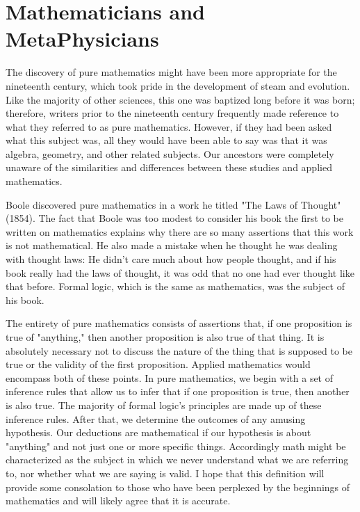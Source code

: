 \documentclass[a4paper,12pt]{book}[2004/02/16]
\theoremstyle{ilemma}
\theoremstyle{itheorem}
\theoremstyle{iother}
\theoremstyle{icorollary}
\theoremstyle{numcorollary}
\theoremstyle{idefinition}
\begin{document}
\chapter{Mathematicians and MetaPhysicians}
The discovery of pure mathematics might have been more appropriate for the nineteenth century, which took pride in the development of steam and evolution. Like the majority of other sciences, this one was baptized long before it was born; therefore, writers prior to the nineteenth century frequently made reference to what they referred to as pure mathematics. However, if they had been asked what this subject was, all they would have been able to say was that it was algebra, geometry, and other related subjects. Our ancestors were completely unaware of the similarities and differences between these studies and applied mathematics.

Boole discovered pure mathematics in a work he titled "The Laws of Thought" (1854). The fact that Boole was too modest to consider his book the first to be written on mathematics explains why there are so many assertions that this work is not mathematical. He also made a mistake when he thought he was dealing with thought laws:
He didn't care much about how people thought, and if his book really had the laws of thought, it was odd that no one had ever thought like that before. Formal logic, which is the same as mathematics, was the subject of his book.

The entirety of pure mathematics consists of assertions that, if one proposition is true of "anything," then another proposition is also true of that thing. It is absolutely necessary not to discuss the nature of the thing that is supposed to be true or the validity of the first proposition. Applied mathematics would encompass both of these points. In pure mathematics, we begin with a set of inference rules that allow us to infer that if one proposition is true, then another is also true.
The majority of formal logic's principles are made up of these inference rules. After that, we determine the outcomes of any amusing hypothesis. Our deductions are mathematical if our hypothesis is about "anything" and not just one or more specific things. Accordingly math might be characterized as the subject
in which we never understand what we are referring to, nor whether what we
are saying is valid. I hope that this definition will provide some consolation to those who have been perplexed by the beginnings of mathematics and will likely agree that it is accurate.
\end{document}
